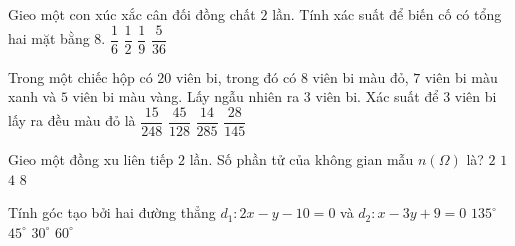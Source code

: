 \begin{ex}%
	Gieo một con xúc xắc cân đối đồng chất $2$ lần. Tính xác suất để biến cố có tổng hai mặt bằng $8$.
	\choice
	{$\dfrac{1}{6}$}
	{$\dfrac{1}{2}$}
	{$\dfrac{1}{9}$}
	{\True $\dfrac{5}{36}$}
\end{ex}

\begin{ex}%
	Trong một chiếc hộp có $20$ viên bi, trong đó có $8$ viên bi màu đỏ, $7$ viên bi màu xanh và $5$ viên bi màu vàng. Lấy ngẫu nhiên ra $3$ viên bi. Xác suất để $3$ viên bi lấy ra đều màu đỏ là
	\choice
	{$\dfrac{15}{248}$}
	{$\dfrac{45}{128}$}
	{\True $\dfrac{14}{285}$}
	{$\dfrac{28}{145}$}
\end{ex}

\begin{ex}%
	Gieo một đồng xu liên tiếp $2$ lần. Số phần tử của không gian mẫu $n(\Omega)$ là?
	\choice
	{$2$}
	{$1$}
	{\True $4$}
	{$8$}
\end{ex}


\begin{ex}%
	Tính góc tạo bởi hai đường thẳng $d_1\colon 2x-y-10=0$ và $d_2\colon x-3y+9=0$
	\choice
	{$135^\circ$}
	{\True $45^\circ$}
	{$30^\circ$}
	{$60^\circ$}
\end{ex}

